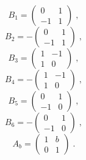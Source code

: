 \indent
$$B_1=\begin{pmatrix}
0 & 1\\
-1 & 1
\end{pmatrix}\; ,$$
$$B_2=-\begin{pmatrix}
0 & 1\\
-1 & 1
\end{pmatrix}\; ,$$
$$B_3=\begin{pmatrix}
1 & -1\\
1 & 0
\end{pmatrix}\; ,$$
$$B_4=-\begin{pmatrix}
1 & -1\\
1 & 0
\end{pmatrix}\; ,$$
$$B_5=\begin{pmatrix}
0 & 1\\
-1 & 0
\end{pmatrix}\; ,$$
$$B_6=-\begin{pmatrix}
0 & 1\\
-1 & 0
\end{pmatrix}\; ,$$
$$A_b=\begin{pmatrix}
1 & b\\
0 & 1
\end{pmatrix}\; .$$


